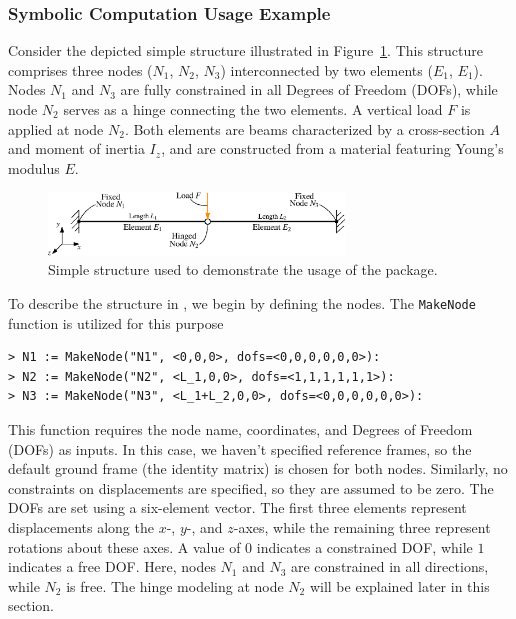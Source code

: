\subsubsection{Symbolic Computation Usage Example}

Consider the depicted simple structure illustrated in Figure~\ref{app4:fig:usage_example}. This structure comprises three nodes ($N_1$, $N_2$, $N_3$) interconnected by two elements ($E_1$, $E_1$). Nodes $N_1$ and $N_3$ are fully constrained in all Degrees of Freedom (\acp{DOF}), while node $N_2$ serves as a hinge connecting the two elements. A vertical load $F$ is applied at node $N_2$. Both elements are beams characterized by a cross-section $A$ and moment of inertia $I_z$, and are constructed from a material featuring Young's modulus $E$.

\begin{figure}[htb]
  \centering
  \includegraphics[width=0.7\textwidth]{./figures/appendix_4/usage_example.eps}
  \caption{Simple structure used to demonstrate the usage of the \TrussMe{} package.}
  \label{app4:fig:usage_example}
\end{figure}

To describe the structure in \TrussMe{}, we begin by defining the nodes. The \texttt{MakeNode} function is utilized for this purpose
%
\begin{verbatim}
> N1 := MakeNode("N1", <0,0,0>, dofs=<0,0,0,0,0,0>):
> N2 := MakeNode("N2", <L_1,0,0>, dofs=<1,1,1,1,1,1>):
> N3 := MakeNode("N3", <L_1+L_2,0,0>, dofs=<0,0,0,0,0,0>):
\end{verbatim}
%
This function requires the node name, coordinates, and Degrees of Freedom (\acp{DOF}) as inputs. In this case, we haven't specified reference frames, so the default ground frame (the identity matrix) is chosen for both nodes. Similarly, no constraints on displacements are specified, so they are assumed to be zero. The \acp{DOF} are set using a six-element vector. The first three elements represent displacements along the $x$-, $y$-, and $z$-axes, while the remaining three represent rotations about these axes. A value of $0$ indicates a constrained \ac{DOF}, while $1$ indicates a free \ac{DOF}. Here, nodes $N_1$ and $N_3$ are constrained in all directions, while $N_2$ is free. The hinge modeling at node $N_2$ will be explained later in this section.

